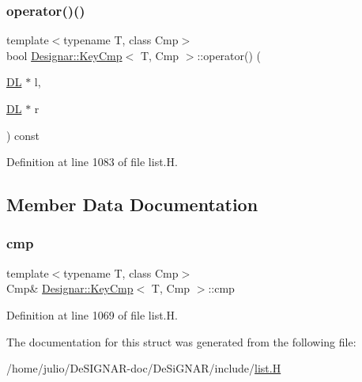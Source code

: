 \subsubsection{\texorpdfstring{operator()()}{operator()()}}
{\footnotesize\ttfamily template$<$typename T, class Cmp$>$ \\
bool \hyperlink{struct_designar_1_1_key_cmp}{Designar\+::\+Key\+Cmp}$<$ T, Cmp $>$\+::operator() (\begin{DoxyParamCaption}\item[{\hyperlink{class_designar_1_1_d_l}{DL} $\ast$}]{l,  }\item[{\hyperlink{class_designar_1_1_d_l}{DL} $\ast$}]{r }\end{DoxyParamCaption}) const\hspace{0.3cm}{\ttfamily [inline]}}



Definition at line 1083 of file list.\+H.



\subsection{Member Data Documentation}
\mbox{\label{struct_designar_1_1_key_cmp_a459613d03deb91c821f26cfafdd93dab}} 
\subsubsection{\texorpdfstring{cmp}{cmp}}
{\footnotesize\ttfamily template$<$typename T, class Cmp$>$ \\
Cmp\& \hyperlink{struct_designar_1_1_key_cmp}{Designar\+::\+Key\+Cmp}$<$ T, Cmp $>$\+::cmp}



Definition at line 1069 of file list.\+H.



The documentation for this struct was generated from the following file\+:\begin{DoxyCompactItemize}
\item 
/home/julio/\+De\+S\+I\+G\+N\+A\+R-\/doc/\+De\+Si\+G\+N\+A\+R/include/\hyperlink{list_8_h}{list.\+H}\end{DoxyCompactItemize}
